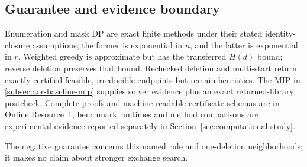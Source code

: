 \subsection{Guarantee and evidence boundary}

Enumeration and mask DP are exact finite methods under their stated
identity-closure assumptions; the former is exponential in \(n\), and the
latter is exponential in \(r\).  Weighted greedy is approximate but has the
transferred \(H(d)\) bound; reverse deletion preserves that bound.  Rechecked
deletion and multi-start return exactly certified feasible, irreducible
endpoints but remain heuristics.  The MIP in
\cref{subsec:aor-baseline-mip} supplies solver evidence plus an exact
returned-library postcheck.  Complete proofs and machine-readable certificate
schemas are in Online Resource~1; benchmark runtimes and method comparisons
are experimental evidence reported separately in Section~\ref{sec:computational-study}.

The negative guarantee concerns this named rule and one-deletion neighborhoods; it makes no claim about stronger exchange search.
